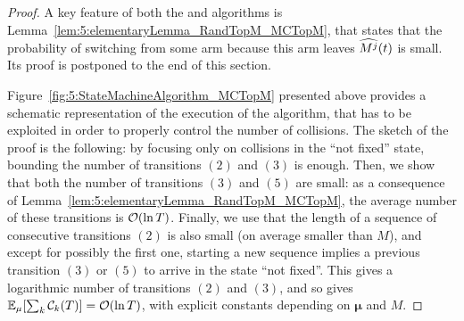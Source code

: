 \begin{proof}
  A key feature of both the \RandTopM{} and \MCTopM{} algorithms is Lemma~\ref{lem:5:elementaryLemma_RandTopM_MCTopM}, that states that the probability of switching from some arm because this arm leaves $\widehat{M^j}(t)$ is small. Its proof is postponed to the end of this section.


  Figure~\ref{fig:5:StateMachineAlgorithm_MCTopM} presented above provides a schematic representation of the execution of the \MCTopM{} algorithm, that has to be exploited in order to properly control the number of collisions.
  The sketch of the proof is the following: by focusing only on collisions in the ``not fixed'' state, bounding the number of transitions $(2)$ and $(3)$ is enough.
  Then, we show that both the number of transitions $(3)$ and $(5)$ are small: as a consequence of Lemma~\ref{lem:5:elementaryLemma_RandTopM_MCTopM}, the average number of these transitions is $\mathop{}\mathopen{}\mathcal{O}\mathopen{}\left(\ln T\right)$.
  Finally, we use that the length of a sequence of consecutive transitions $(2)$ is also small (on average smaller than $M$), and except for possibly the first one, starting a new sequence implies a previous transition $(3)$ or $(5)$ to arrive in the state ``not fixed''. This gives a logarithmic number of transitions $(2)$ and $(3)$, and so gives $\mathbb{E}_{\mu}[\sum_k\mathcal{C}_k(T)] = \mathop{}\mathopen{}\mathcal{O}\mathopen{}\left(\ln T\right)$,
  with explicit constants depending on $\boldsymbol{\mu}$ and $M$.



\end{proof}
